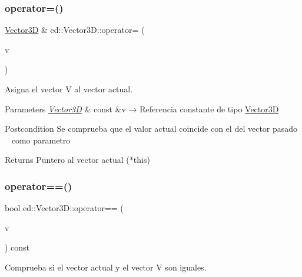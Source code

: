 \subsubsection{\texorpdfstring{operator=()}{operator=()}}
{\footnotesize\ttfamily \mbox{\hyperlink{classed_1_1Vector3D}{Vector3D}} \& ed\+::\+Vector3\+D\+::operator= (\begin{DoxyParamCaption}\item[{\mbox{\hyperlink{classed_1_1Vector3D}{Vector3D}} const \&}]{v }\end{DoxyParamCaption})}



Asigna el vector V al vector actual. 


\begin{DoxyParams}{Parameters}
{\em \mbox{\hyperlink{classed_1_1Vector3D}{Vector3D}}} & const \&v → Referencia constante de tipo \mbox{\hyperlink{classed_1_1Vector3D}{Vector3D}} \\
\hline
\end{DoxyParams}
\begin{DoxyPostcond}{Postcondition}
Se comprueba que el valor actual coincide con el del vector pasado ~\newline
 como parametro 
\end{DoxyPostcond}
\begin{DoxyReturn}{Returns}
Puntero al vector actual ($\ast$this) 
\end{DoxyReturn}
\mbox{\label{classed_1_1Vector3D_a09cbd7f5d848a95b652be1a66703710f}} 
\subsubsection{\texorpdfstring{operator==()}{operator==()}}
{\footnotesize\ttfamily bool ed\+::\+Vector3\+D\+::operator== (\begin{DoxyParamCaption}\item[{\mbox{\hyperlink{classed_1_1Vector3D}{ed\+::\+Vector3D}} const \&}]{v }\end{DoxyParamCaption}) const}



Comprueba si el vector actual y el vector V son iguales. 


